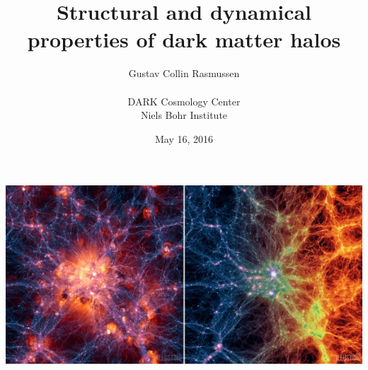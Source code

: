 \documentclass[a4paper,11pt]{article}
\title{\textbf{Structural and dynamical properties of dark matter halos}}
\author{Gustav Collin Rasmussen \\ \\
DARK Cosmology Center \\
Niels Bohr Institute
}
\begin{document}
\date{May 16, 2016}
\pagestyle{empty}
\maketitle
\centerline{\includegraphics{img/Illustris_01.jpg}}
\thispagestyle{empty}
\newpage
{}
\pagestyle{plain}
\tableofcontents
\newpage



\newpage


\newpage

\newpage

\newpage

\newpage

\newpage

\newpage

\newpage

\newpage


\newpage


\begin{appendix}



\newpage

\newpage

\newpage

\newpage

\newpage

\newpage

\newpage

\newpage

\newpage
% 
% 

\newpage

\newpage

\newpage

\end{appendix}
\end{document}
